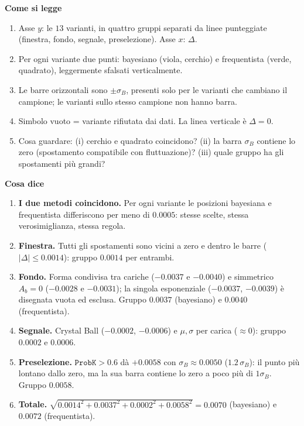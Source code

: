 \documentclass[10.5pt,a4paper]{article}
\newcommand{\sez}[1]{\par\Needspace{6\baselineskip}\medskip\noindent\textbf{\large #1}\par\nopagebreak\smallskip}
\begin{document}
\sez{Come si legge}
\begin{enumerate}
\item Asse $y$: le $13$ varianti, in quattro gruppi separati da linee punteggiate (finestra, fondo, segnale, preselezione). Asse $x$: $\Delta$.
\item Per ogni variante due punti: bayesiano (viola, cerchio) e frequentista (verde, quadrato), leggermente sfalsati verticalmente.
\item Le barre orizzontali sono $\pm\sigma_B$, presenti solo per le varianti che cambiano il campione; le varianti sullo stesso campione non hanno barra.
\item Simbolo vuoto = variante rifiutata dai dati. La linea verticale è $\Delta=0$.
\item Cosa guardare: (i) cerchio e quadrato coincidono? (ii) la barra $\sigma_B$ contiene lo zero (spostamento compatibile con fluttuazione)? (iii) quale gruppo ha gli spostamenti più grandi?
\end{enumerate}

\sez{Cosa dice}
\begin{enumerate}
\item \textbf{I due metodi coincidono.} Per ogni variante le posizioni bayesiana e frequentista differiscono per meno di $0.0005$: stesse scelte, stessa verosimiglianza, stessa regola.
\item \textbf{Finestra.} Tutti gli spostamenti sono vicini a zero e dentro le barre ($|\Delta|\le0.0014$): gruppo $0.0014$ per entrambi.
\item \textbf{Fondo.} Forma condivisa tra cariche ($-0.0037$ e $-0.0040$) e simmetrico $A_b=0$ ($-0.0028$ e $-0.0031$); la singola esponenziale ($-0.0037$, $-0.0039$) è disegnata vuota ed esclusa. Gruppo $0.0037$ (bayesiano) e $0.0040$ (frequentista).
\item \textbf{Segnale.} Crystal Ball ($-0.0002$, $-0.0006$) e $\mu,\sigma$ per carica ($\approx0$): gruppo $0.0002$ e $0.0006$.
\item \textbf{Preselezione.} $\mathtt{ProbK}>0.6$ dà $+0.0058$ con $\sigma_B\approx0.0050$ ($1.2\,\sigma_B$): il punto più lontano dallo zero, ma la sua barra contiene lo zero a poco più di $1\sigma_B$. Gruppo $0.0058$.
\item \textbf{Totale.} $\sqrt{0.0014^2+0.0037^2+0.0002^2+0.0058^2}=0.0070$ (bayesiano) e $0.0072$ (frequentista).
\end{enumerate}
\end{document}
